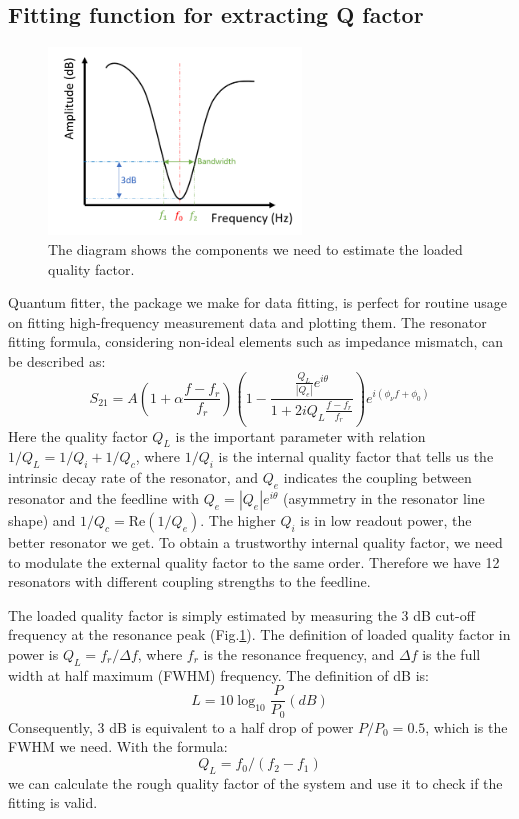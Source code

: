 \subsection{Fitting function for extracting Q factor}
\begin{figure}[h!]
    \centering
    \includegraphics[width=0.6\textwidth]{Pic/3dB_est.png}
    \caption{The diagram shows the components we need to estimate the loaded quality factor.}
    \label{estQL}
\end{figure}
Quantum fitter, the package we make for data fitting, is perfect for routine usage on fitting high-frequency measurement data and plotting them. The resonator fitting formula, considering non-ideal elements such as impedance mismatch, can be described as\cite{RN64, RN66}:
\begin{equation}\label{ResonatorFit}
    S_{21} = A \left(1 + \alpha \frac{f-f_r}{f_r}\right)\left(1-\frac{\frac{Q_L}{|Q_e|}e^{i\theta}}{1+2iQ_L\frac{f-f_r}{f_r}}\right) e^{i(\phi_\nu f + \phi_0)}
\end{equation}
Here the quality factor $Q_L$ is the important parameter with relation $1/Q_L = 1/Q_i + 1/Q_c$, where $1/Q_i$ is the internal quality factor that tells us the intrinsic decay rate of the resonator, and $Q_e$ indicates the coupling between resonator and the feedline with $Q_e = |Q_e|e^{i\theta}$ (asymmetry in the resonator line shape) and $1/Q_c = \text{Re}(1/Q_e)$. The higher $Q_i$ is in low readout power, the better resonator we get. To obtain a trustworthy internal quality factor, we need to modulate the external quality factor to the same order. Therefore we have 12 resonators with different coupling strengths to the feedline. 

The loaded quality factor is simply estimated by measuring the 3 dB cut-off frequency at the resonance peak (Fig.\ref{estQL}). The definition of loaded quality factor in power is $Q_L = f_r / \Delta f$, where $f_r$ is the resonance frequency, and $\Delta f$ is the full width at half maximum (FWHM) frequency. The definition of dB is:
\begin{equation}
    L = 10 \log_{10}\frac{P}{P_0} (dB)
\end{equation}
Consequently, 3 dB is equivalent to a half drop of power $P/P_0 = 0.5$, which is the FWHM we need. With the formula:
\begin{equation}
    Q_L = f_0 / (f_2 - f_1)
\end{equation}
we can calculate the rough quality factor of the system and use it to check if the fitting is valid.


